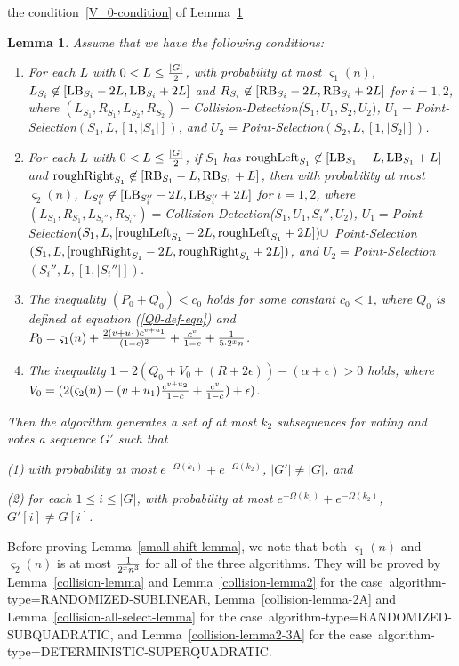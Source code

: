 \documentclass[11pt]{article}
\newtheorem{lemmafoo}[theoremfoo]{Lemma}
\newenvironment{lemma}{\pagebreak[1]\begin{lemmafoo}}{\end{lemmafoo}}
\newcommand{\roughright}{{\rm roughRight}}
\newcommand{\LB}{{\rm LB}}
\newcommand{\RB}{{\rm RB}}
\newcommand{\algtype}{{\rm algorithm-type}}
\newcommand{\sublinear}{{\rm RANDOMIZED-SUBLINEAR}}
\newcommand{\randomized}{{\rm RANDOMIZED-SUBQUADRATIC}}
\newcommand{\deterministic}{{\rm DETERMINISTIC-SUPERQUADRATIC}}
\begin{document}
the condition~\ref{V_0-condition} of Lemma~\ref{general-lemma}

\begin{lemma}\label{general-lemma}
Assume that we have the following conditions:
\begin{enumerate}
\item\label{varsigma1-condition}
For each $L$ with $0<L\le {|G|\over 2}$, with probability at most
$\varsigma_1(n)$, $L_{S_i}\not \in [\LB_{S_i}-2L, \LB_{S_i}+2L]$ and
$R_{S_i}\not \in [\RB_{S_i}-2L, \RB_{S_i}+2L]$ for $i=1,2$, where
$(L_{S_1}, R_{S_1}, L_{S_2}, R_{S_2})=$Collision-Detection($S_1,
U_1, S_2, U_2)$, $U_1=$Point-Selection$(S_1,L, [1,|S_1|])$, and
$U_2=$Point-Selection$(S_2,L, [1,|S_2|])$.

\item\label{varsigma2-condition}
For each $L$ with $0<L\le {|G|\over 2}$, if $S_1$ has
$\roughleft_{S_1}\not \in [\LB_{S_1}-L, \LB_{S_1}+L]$ and
$\roughright_{S_1}\not \in [\RB_{S_1}-L, \RB_{S_1}+L]$, then
 with probability at most
$\varsigma_2(n)$, $L_{S_i''}\not \in [\LB_{S_i''}-2L,
\LB_{S_i''}+2L]$ for $i=1,2$, where $(L_{S_1}, R_{S_1}, L_{S_i''},
R_{S_i''})=$Collision-Detection($S_1, U_1, S_i'', U_2)$,
$U_1=$Point-Selection$(S_1,L,
[{\rm roughLeft}_{S_1}-2L,{\rm roughLeft}_{S_1}+2L])\cup$
Point-Selection$(S_1,L,
[\roughright_{S_1}-2L,\roughright_{S_1}+2L])$, and
$U_2=$Point-Selection$(S_i'',L, [1,|S_i''|])$.

\item\label{P0-Q0-condition}
The inequality $(P_0+Q_0)<c_0$ holds for some constant $c_0<1$,
where $Q_0$ is defined at equation (\ref{Q0-def-eqn}) and
$P_0=\varsigma_1(n)+ {2(v+u_1)c^{v+u_1}\over (1-c)^2}+{c^v\over
1-c}+{1\over 5\cdot 2^x n}$.

\item\label{V_0-condition} The inequality
$1-2(Q_0+V_0+(R+2\epsilon))-(\alpha+\epsilon)>0$ holds, where
$V_0=(2(\varsigma_2(n)+ (v+u_1){c^{v+u_2}\over 1-c}+{c^{v}\over
1-c})+\epsilon)$.
\end{enumerate}

Then the algorithm generates a set of at most $k_2$ subsequences for
voting and votes a sequence $G'$ such that

(1) with probability at most $e^{-\Omega(k_1)}+e^{-\Omega(k_2)}$,
$|G'|\not=|G|$, and

(2) for each $1\le i\le |G|$, with probability at most
$e^{-\Omega(k_1)}+e^{-\Omega(k_2)}$, $G'[i]\not=G[i]$.
\end{lemma}

Before proving Lemma~\ref{small-shift-lemma}, we note that both
$\varsigma_1(n)$ and $\varsigma_2(n)$ is at most ${1\over 2^xn^3}$
for all of the three algorithms. They will be proved by
Lemma~\ref{collision-lemma} and Lemma~\ref{collision-lemma2} for the
case~\algtype=\sublinear, Lemma~\ref{collision-lemma-2A} and
Lemma~\ref{collision-all-select-lemma} for the
case~\algtype=\randomized, and Lemma~\ref{collision-lemma2-3A} for
the case~\algtype=\deterministic.
\end{document}
